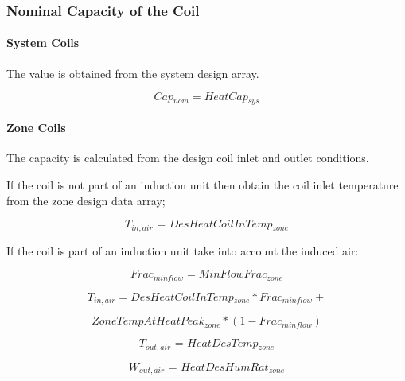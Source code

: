 \subsubsection{Nominal Capacity of the Coil}\label{nominal-capacity-of-the-coil}

\paragraph{System Coils}\label{system-coils-3}

The value is obtained from the system design array.

\begin{equation}
\textit{Cap\(_{nom}\)} = \textit{HeatCap\(_{sys}\)}
\end{equation}

\paragraph{Zone Coils}\label{zone-coils-3}

The capacity is calculated from the design coil inlet and outlet conditions.

If the coil is not part of an induction unit then obtain the coil inlet temperature from the zone design data array;

\begin{equation}
\textit{T\(_{in,air}\) = DesHeatCoilInTemp\(_{zone}\)}
\end{equation}

If the coil is part of an induction unit take into account the induced air:

\begin{equation}
\textit{Frac\(_{minflow}\)} = \textit{MinFlowFrac\(_{zone}\)}
\end{equation}

\begin{equation}
\textit{T\(_{in,air}\)} = \textit{DesHeatCoilInTemp\(_{zone}\)} * \textit{Frac\(_{minflow}\)} +
\end{equation}

\begin{equation}
\textit{ZoneTempAtHeatPeak\(_{zone}\)} *(1- \textit{Frac\(_{minflow}\)})
\end{equation}

\begin{equation}
\textit{T\(_{out,air}\) = HeatDesTemp\(_{zone}\)}
\end{equation}

\begin{equation}
W\textit{\(_{out,air}\) = HeatDesHumRat\(_{zone}\)}
\end{equation}

